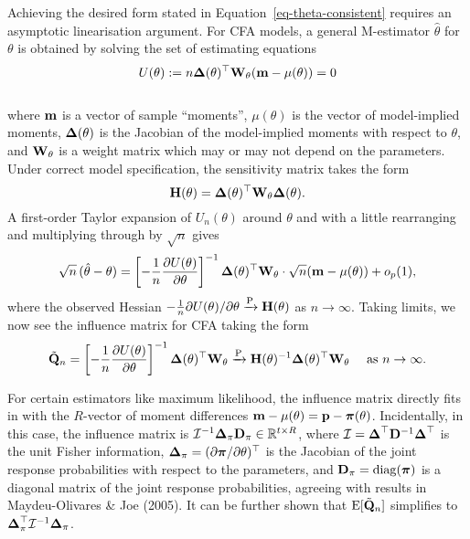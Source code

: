 \documentclass[
  letterpaper,
  DIV=11,
  numbers=noendperiod]{scrartcl}
\begin{document}
\begin{table}

\caption{\label{tbl-objfun-deriv}}


\end{table}%

Achieving the desired form stated in Equation~\ref{eq-theta-consistent}
requires an asymptotic linearisation argument. For CFA models, a general
M-estimator \(\hat\theta\) for \(\theta\) is obtained by solving the set
of estimating equations \[
U(\theta) := n {\boldsymbol\Delta}(\theta)^\top {\mathbf W}_{\theta} ({\mathbf m} - \mu(\theta)) = 0
\]\\
where \({\mathbf m}\) is a vector of sample ``moments'', \(\mu(\theta)\) is the
vector of model-implied moments, \({\boldsymbol\Delta}(\theta)\) is the Jacobian of
the model-implied moments with respect to \(\theta\), and
\({\mathbf W}_{\theta}\) is a weight matrix which may or may not depend on the
parameters. Under correct model specification, the sensitivity matrix
takes the form \[
{\mathbf H}(\theta) = {\boldsymbol\Delta}(\theta)^{\top} {\mathbf W}_{\theta}  {\boldsymbol\Delta}(\theta).
\] A first-order Taylor expansion of \(U_n(\theta)\) around \(\theta\)
and with a little rearranging and multiplying through by \(\sqrt n\)
gives\\
\[
\sqrt{n}\,(\hat\theta - \theta)
=
\left[ - \frac{1}{n} \frac{\partial U(\theta)}{\partial\theta} \right]^{-1}
{\boldsymbol\Delta}(\theta)^\top {\mathbf W}_{\theta} \cdot \sqrt n ({\mathbf m} - \mu(\theta))
+ o_p(1),
\] where the observed Hessian
\(-\frac{1}{n}\partial U(\theta) / \partial\theta \xrightarrow{\text P} {\mathbf H}(\theta)\)
as \(n \to \infty\). Taking limits, we now see the influence matrix for
CFA taking the form \[
\tilde {{\mathbf Q}}_n = \left[ - \frac{1}{n} \frac{\partial U(\theta)}{\partial\theta} \right]^{-1}
{\boldsymbol\Delta}(\theta)^\top {\mathbf W}_{\theta} \xrightarrow{\text P} {\mathbf H}(\theta)^{-1} {\boldsymbol\Delta}(\theta)^\top {\mathbf W}_{\theta} \quad \text{ as } n\to\infty.
\]

For certain estimators like maximum likelihood, the influence matrix
directly fits in with the \(R\)-vector of moment differences
\({\mathbf m} - \mu(\theta) = {\mathbf p} - {\boldsymbol\pi}(\theta)\). Incidentally, in this case,
the influence matrix is
\({\mathcal I}^{-1} {\boldsymbol\Delta}_\pi {\mathbf D}_\pi \in \mathbb{R}^{t \times R}\), where
\({\mathcal I}= {\boldsymbol\Delta}^\top {\mathbf D}^{-1} {\boldsymbol\Delta}^\top\) is the unit Fisher
information, \({\boldsymbol\Delta}_\pi= (\partial {\boldsymbol\pi} / \partial \theta)^\top\) is
the Jacobian of the joint response probabilities with respect to the
parameters, and \({\mathbf D}_\pi = \operatorname{diag}({\boldsymbol\pi})\) is a diagonal matrix of the
joint response probabilities, agreeing with results in Maydeu-Olivares
\& Joe (2005). It can be further shown that \(\operatorname{E}[\tilde{{\mathbf Q}}_n]\)
simplifies to \({\boldsymbol\Delta}_\pi^\top {\mathcal I}^{-1} {\boldsymbol\Delta}_\pi\).
\end{document}
